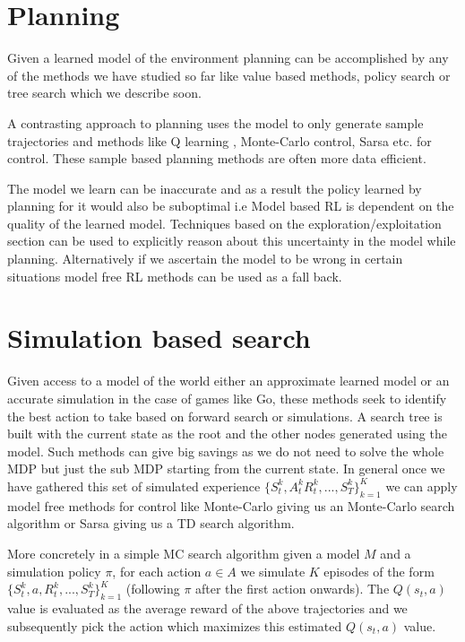 \documentclass{article}
\begin{document}
\section{Planning}
Given a learned model of the environment planning can be accomplished by any of the methods we have studied so far like value based methods, policy search or tree search which we describe soon. \par
A contrasting approach to planning uses the model to only generate sample trajectories and methods like Q learning , Monte-Carlo control, Sarsa etc. for control. These sample based planning methods are often more data efficient. \par
The model we learn can be inaccurate and as a result the policy learned by planning for it would also be suboptimal i.e Model based RL is dependent on the quality of the learned model. Techniques based on the exploration/exploitation section can be used to explicitly reason about this uncertainty in the model while planning. Alternatively if we ascertain the model to be wrong in certain situations model free RL methods can be used as a fall back.
\section{Simulation based search}
Given access to a model of the world either an approximate learned model or an accurate simulation in the case of games like Go, these methods seek to identify the best action to take based on forward search or simulations. A search tree is built with the current state as the root and the other nodes generated using the model. Such methods can give big savings as we do not need to solve the whole MDP but just the sub MDP starting from the current state. In general once we have gathered this set of simulated experience $\{S_t^k,A_t^kR_t^k,...,S_T^k\}^K_{k=1}$ we can apply model free methods for control like Monte-Carlo giving us an Monte-Carlo search algorithm or Sarsa giving us a TD search algorithm.\par
More concretely in a simple MC search algorithm given a model $M$ and a simulation policy $\pi$, for each action $a\in A$ we simulate $K$ episodes of the form $\{S_t^k,a,R_t^k,...,S_T^k\}^K_{k=1}$ (following $\pi$ after the first action onwards). The $Q(s_t,a)$ value is evaluated as the average reward of the above trajectories and we subsequently pick the action which maximizes this estimated $Q(s_t,a)$ value.
\end{document}
